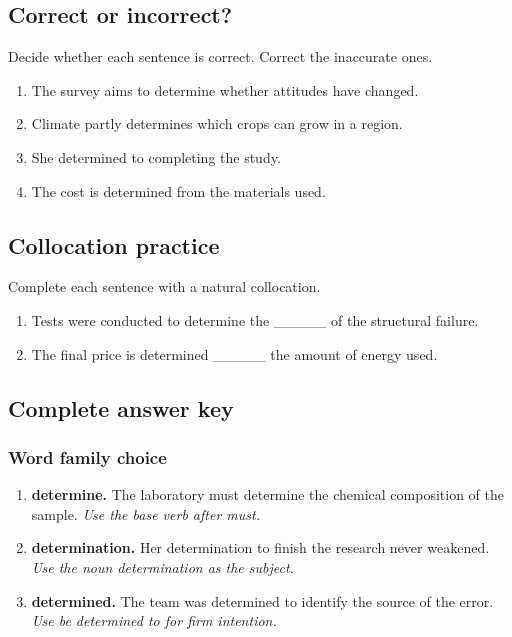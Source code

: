 \documentclass[11pt]{article}
\begin{document}
\subsection{Correct or incorrect?}
Decide whether each sentence is correct. Correct the inaccurate ones.

\begin{enumerate}
  \item The survey aims to determine whether attitudes have changed.
  \item Climate partly determines which crops can grow in a region.
  \item She determined to completing the study.
  \item The cost is determined from the materials used.
\end{enumerate}

\subsection{Collocation practice}
Complete each sentence with a natural collocation.

\begin{enumerate}
  \item Tests were conducted to determine the \_\_\_\_\_ of the structural failure.
  \item The final price is determined \_\_\_\_\_ the amount of energy used.
\end{enumerate}

\subsection{Complete answer key}
\subsubsection{Word family choice}
\begin{enumerate}
  \item \textbf{determine.} The laboratory must determine the chemical composition of the sample. \emph{Use the base verb after must.}
  \item \textbf{determination.} Her determination to finish the research never weakened. \emph{Use the noun determination as the subject.}
  \item \textbf{determined.} The team was determined to identify the source of the error. \emph{Use be determined to for firm intention.}
\end{enumerate}
\end{document}
